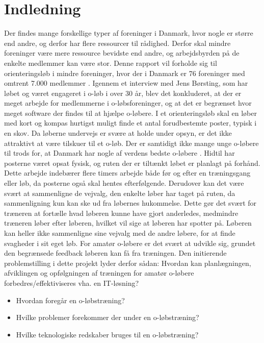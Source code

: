\chapter{Indledning}
Der findes mange forskellige typer af foreninger i Danmark, hvor nogle er større end andre, og derfor har flere ressourcer til rådighed. Derfor skal mindre foreninger være mere ressource bevidste end andre, og arbejdsbyrden på de enkelte medlemmer kan være stor.\newline
Denne rapport vil forholde sig til orienteringsløb i mindre foreninger, hvor der i Danmark er 76 foreninger med omtrent 7.000 medlemmer \citep{DIF}. Igennem et interview med Jens Børsting, som har løbet og været engageret i o-løb i over 30 år, blev det konkluderet, at der er meget arbejde for medlemmerne i o-løbsforeninger, og at det er begrænset hvor meget software der findes til at hjælpe o-løbere. \newline
I et orienteringsløb skal en løber med kort og kompas hurtigst muligt finde et antal forudbestemte poster, typisk i en skov. Da løberne undervejs er svære at holde under opsyn, er det ikke attraktivt at være tilskuer til et o-løb. Der er samtidigt ikke mange unge o-løbere til trods for, at Danmark har nogle af verdens bedste o-løbere \citep{RANK}. \newline
Hidtil har posterne været opsat fysisk, og ruten der er tiltænkt løbet er planlagt på forhånd. Dette arbejde indebærer flere timers arbejde både før og efter en træningsgang eller løb, da posterne også skal hentes efterfølgende. Derudover kan det være svært at sammenligne de vejvalg, den enkelte løber har taget på ruten, da sammenligning kun kan ske ud fra løbernes hukommelse. Dette gør det svært for træneren at fortælle hvad løberen kunne have gjort anderledes, medmindre træneren løber efter løberen, hvilket vil sige at løberen har spotter på. Løberen kan heller ikke sammenligne sine vejvalg med de andre løbere, for at finde svagheder i sit eget løb.\newline 
For amatør o-løbere er det svært at udvikle sig, grundet den begrænsede feedback løberen kan få fra træningen.\newline
Den initierende problemstilling i dette projekt lyder derfor sådan:\newline
Hvordan kan planlægningen, afviklingen og opfølgningen af træningen for amatør o-løbere forbedres/effektiviseres vha. en IT-løsning?
\begin{itemize}
	\item Hvordan foregår en o-løbstræning?
	\item Hvilke problemer forekommer der under en o-løbstræning?
	\item Hvilke teknologiske redskaber bruges til en o-løbstræning?	
\end{itemize} 
